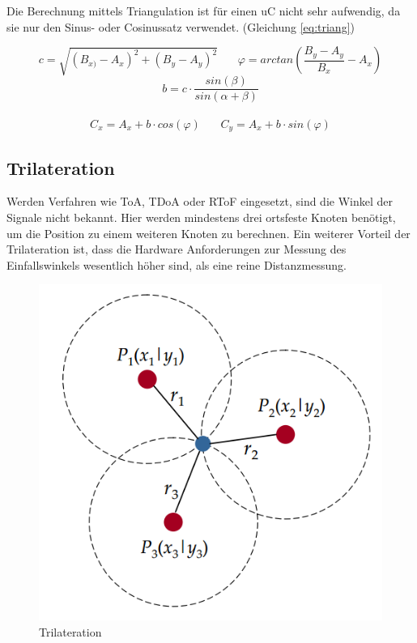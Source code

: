 Die Berechnung mittels Triangulation ist für einen \ac{uC} nicht sehr
aufwendig, da sie nur den Sinus- oder Cosinussatz verwendet. (Gleichung
\ref{eq:triang})

\pagebreak
\begin{framed}
\begin{equation}
  \label{eq:triang}
  c = \sqrt{(B_{x)} - A_{x})^2 + (B_{y} - A_{y})^2}
  ~~~~~~~~
  \varphi = arctan(\frac{B_{y} - A_{y}}{B_{x}} - A_{x})
\end{equation}
\begin{equation*}
  b = c \cdot \frac{sin(\beta)}{sin(\alpha + \beta)}
\end{equation*}
~\\
\begin{equation*}
  C_{x} = A_{x} + b \cdot cos(\varphi)
  ~~~~~~~~
  C_{y} = A_{x} + b \cdot sin(\varphi)
\end{equation*}
\end{framed}


\subsection{Trilateration}

Werden Verfahren wie \ac{ToA}, \ac{TDoA} oder \ac{RToF} eingesetzt,
sind die Winkel der Signale nicht bekannt. Hier werden mindestens
drei ortsfeste Knoten benötigt, um die Position zu einem weiteren
Knoten zu berechnen. Ein weiterer Vorteil der Trilateration ist, dass
die Hardware Anforderungen zur Messung des Einfallswinkels wesentlich
höher sind, als eine reine Distanzmessung. \cite{roehrig2009} 

\begin{figure}[h!]
  \centering
  \includegraphics[scale=0.5]{img/trilat}

  \caption{Trilateration}
  \label{fig:trilat}
\end{figure}

